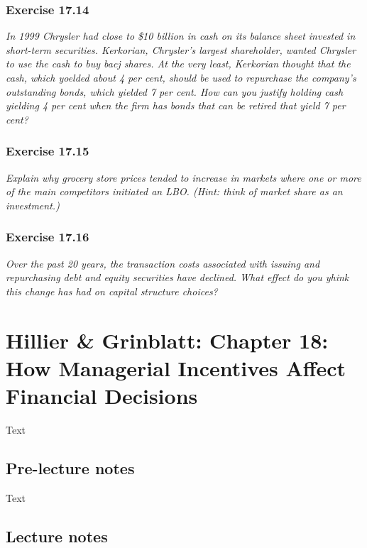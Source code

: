 \documentclass[]{book}
\theoremstyle{definition}
\theoremstyle{definition}
\theoremstyle{remark}
\begin{document}
\subsection{Exercise 17.14}\label{exercise-17.14}

\emph{In 1999 Chrysler had close to \$10 billion in cash on its balance
sheet invested in short-term securities. Kerkorian, Chrysler's largest
shareholder, wanted Chrysler to use the cash to buy bacj shares. At the
very least, Kerkorian thought that the cash, which yoelded about 4 per
cent, should be used to repurchase the company's outstanding bonds,
which yielded 7 per cent. How can you justify holding cash yielding 4
per cent when the firm has bonds that can be retired that yield 7 per
cent?} \citep[p.576]{book}

\subsection{Exercise 17.15}\label{exercise-17.15}

\emph{Explain why grocery store prices tended to increase in markets
where one or more of the main competitors initiated an LBO. (Hint: think
of market share as an investment.)} \citep[p.576]{book}

\subsection{Exercise 17.16}\label{exercise-17.16}

\emph{Over the past 20 years, the transaction costs associated with
issuing and repurchasing debt and equity securities have declined. What
effect do you yhink this change has had on capital structure choices?}
\citep[p.576]{book}

\chapter{Hillier \& Grinblatt: Chapter 18: How Managerial Incentives
Affect Financial
Decisions}\label{hillier-grinblatt-chapter-18-how-managerial-incentives-affect-financial-decisions}

Text

\section{Pre-lecture notes}\label{pre-lecture-notes-18}

Text

\section{Lecture notes}\label{lecture-notes-18}
\end{document}
